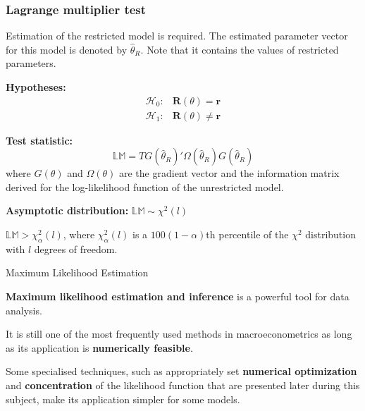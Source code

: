 \documentclass[notes,blackandwhite,mathsans]{beamer}
\begin{document}
\begin{frame}
\frametitle{Lagrange multiplier test}
\small
{\color{mcxs3}Estimation of the restricted model is required. The estimated parameter vector for this model is denoted by} $\hat\theta_R$. {\color{mcxs3}Note that it contains the values of restricted parameters.}

\vspace{0.3cm}\textbf{Hypotheses:}
\begin{align*}
\mathcal{H}_0: & \mathbf{R}(\theta) = \mathbf{r}\\
\mathcal{H}_1: & \mathbf{R}(\theta) \neq \mathbf{r}
\end{align*}

\textbf{Test statistic:}
$$ \mathbb{LM} = TG(\hat\theta_R)'\Omega(\hat\theta_R)G(\hat\theta_R) $$
{\color{mcxs3}where} $G(\theta)$ {\color{mcxs3}and} $\Omega(\theta)$ {\color{mcxs3}are the gradient vector and the information matrix derived for the log-likelihood function of the} {\color{mcxs2}unrestricted model.}

\vspace{0.3cm}\textbf{Asymptotic distribution:} $\mathbb{LM}\sim\chi^2(l)$

 $\mathbb{LM}>\chi^2_{\alpha}(l)${\color{mcxs3}, where} $\chi^2_{\alpha}(l)$ {\color{mcxs3}is a} $100(1-\alpha)$th {\color{mcxs3}percentile of the} $\chi^2$ {\color{mcxs3}distribution with $l$ degrees of freedom.}

\end{frame}



{
\begin{frame}{Maximum Likelihood Estimation}

\textbf{Maximum likelihood estimation and inference} is a powerful tool for data analysis. 

\bigskip It is still one of the most frequently used methods in macroeconometrics as long as its application is \textbf{numerically feasible}.

\bigskip Some specialised techniques, such as appropriately set \textbf{numerical optimization} and \textbf{concentration} of the likelihood function that are presented later during this subject, make its application simpler for some models.

\end{frame}
}
\end{document}
